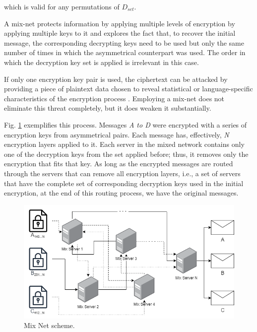 \documentclass[../access.tex]{subfiles}
\begin{document}
            which is valid for any permutations of $ D_{set}. $
            \par
            A mix-net protects information by applying multiple levels of encryption by applying multiple keys to it and explores the fact that, to recover the initial message, the corresponding decrypting keys need to be used but only the same number of times in which the asymmetrical counterpart was used. The order in which the decryption key set is applied is irrelevant in this case.
            \par
            If only one encryption key pair is used, the ciphertext can be attacked by providing a piece of plaintext data chosen to reveal statistical or language-specific characteristics of the encryption process \cite{Schneider1994}. Employing a mix-net does not eliminate this threat completely, but it does weaken it substantially.
            \par
            Fig. \ref{fig:mix-nets} exemplifies this process. Messages \emph{A to D} were encrypted with a series of encryption keys from asymmetrical pairs. Each message has, effectively, \emph{N} encryption layers applied to it. Each server in the mixed network contains only one of the decryption keys from the set applied before; thus, it removes only the encryption that fits that key. As long as the encrypted messages are routed through the servers that can remove all encryption layers, i.e., a set of servers that have the complete set of corresponding decryption keys used in the initial encryption, at the end of this routing process, we have the original messages.
            
            \begin{figure}[ht!]
                \centering
                \includegraphics[width=\columnwidth]{Images/almei3.png}
                \caption{Mix Net scheme.}
                \label{fig:mix-nets}
            \end{figure}
            
\end{document}

